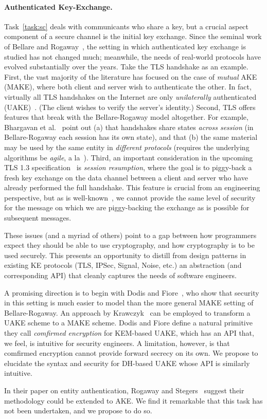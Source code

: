 \paragraph{Authenticated Key-Exchange. }
%
Task~\ref{task:sc} deals with communicants who share a key, but a crucial aspect
component of a secure channel is the initial key exchange.
%
Since the seminal work of Bellare and Rogaway~\cite{BR93}, the setting in which
authenticated key exchange is studied has not changed much; meanwhile, the needs of
real-world protocols have evolved substantially over the years. Take the TLS
handshake  as an example.
%
First, the vast majority of the literature has focused on the case of
\emph{mutual} AKE (MAKE), where both client and server wish to authenticate
the other. In fact, virtually all TLS handshakes on the Internet are only
\emph{unilaterally} authenticated (UAKE)~\cite{xxx}. (The client wishes to
verify the server's identity.)
%
Second, TLS offers features that break with the Bellare-Rogaway model
altogether. For example, Bhargavan et al.~\cite{bhargavan2014proving} point
out (a) that handshakes share states \emph{across session} (in
Bellare-Rogaway each session has its own state), and that (b) the same
material may be used by the same entity in \emph{different protocols}
(requires the underlying algorithms be \emph{agile}, a
la~\cite{acar2010cryptographic}).
%
Third, an important consideration in the upcoming TLS 1.3
specification~\cite{tls13} is \emph{session resumption}, where the goal is
to piggy-back a fresh key exchange on the data channel between a client and
server who have already performed the full handshake. This feature is
crucial from an engineering perspective, but as is well-known~\cite{xxx}, we
cannot provide the same level of security for the message on which we are
piggy-backing the exchange as is possible for subsequent messages.

These issues (and a myriad of others) point to a gap between how programmers
expect they should be able to use cryptography, and how cryptography is to
be used securely. This presents an opportunity to distill from design
patterns in existing KE protocols (TLS, IPSec, Signal, Noise, etc.) an
abstraction (and corresponding API) that cleanly captures the needs of
software engineers.

\begin{task}
  A promising direction is to begin with Dodis and
  Fiore~\cite{dodis2017unilateral}, who show that security in this setting is
  much easier to model than the more general MAKE setting of Bellare-Rogaway.
  An approach by Krawczyk~\cite{krawczyk2016unilateral-to-mutual} can be
  employed to transform a UAKE scheme to a MAKE scheme.
  Dodis and Fiore define a natural primitive they call
  \emph{comfirmed encryption} for KEM-based UAKE, which has an API that, we
  feel, is intuitive for security engineers.
  A limitation, however, is that comfirmed encryption cannot provide forward
  secrecy on its own. We propose to elucidate the syntax and security for DH-based
  UAKE whose API is similarly intuitive.
\end{task}

\begin{task}
  In their paper on entity authentication, Rogaway and Stegers~\cite{RS09}
  suggest their methodology could be extended to AKE. We find it remarkable that
  this task has not been undertaken, and we propose to do so.
\end{task}
